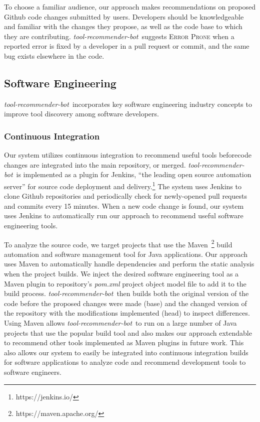 \documentclass[sigconf,review,anonymous]{acmart}
\newcommand{\tool}{\textsl{tool-recommender-bot}}
\begin{document}
To choose a familiar audience, our approach makes recommendations on proposed Github code changes submitted by users. Developers should be knowledgeable and familiar with the changes they propose, as well as the code base to which they are contributing. \tool~suggests \textsc{Error Prone} when a reported error is fixed by a developer in a pull request or commit, and the same bug exists elsewhere in the code. 

\subsection{Software Engineering}

\tool~incorporates key software engineering industry concepts to improve tool discovery among software developers.

\subsubsection{Continuous Integration}

Our system utilizes continuous integration to recommend useful tools beforecode changes are integrated into the main repository, or merged. \tool~is implemented as a plugin for Jenkins, ``the leading open source automation server'' for source code deployment and delivery.\footnote{https://jenkins.io/} The system uses Jenkins to clone Github repositories and periodically check for newly-opened pull requests and commits every 15 minutes. When a new code change is found, our system uses Jenkins to automatically run our approach to recommend useful software engineering tools.

To analyze the source code, we target projects that use the Maven~\footnote{https://maven.apache.org/} build automation and software management tool for Java applications. Our approach uses Maven to automatically handle dependencies and perform the static analysis when the project builds. We inject the desired software engineering tool as a Maven plugin to repository's \textit{pom.xml} project object model file to add it to the build process. \tool~then builds both the original version of the code before the proposed changes were made (base) and the changed version of the repository with the modifications implemented (head) to inspect differences. Using Maven allows \tool~to run on a large number of Java projects that use the popular build tool and also makes our approach extendable to recommend other tools implemented as Maven plugins in future work. This also allows our system to easily be integrated into continuous integration builds for software applications to analyze code and recommend development tools to software engineers.
\end{document}
